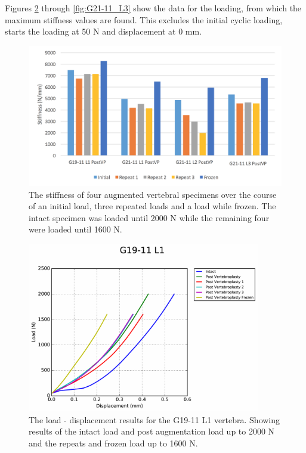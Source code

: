 Figures \ref{fig:G19-11_L1} through \ref{fig:G21-11_L3} show the data for the loading, from which the maximum stiffness values are found.
This excludes the initial cyclic loading, starts the loading at 50 N and displacement at 0 mm.

\begin{figure}[!h]
\centering
\includegraphics[width=6in]{Chapters/Chapter_HT_images/experimental_repeats.png}
\caption{The stiffness of four augmented vertebral specimens over the course of an initial load, three repeated loads and a load while frozen. The intact specimen was loaded until 2000 N while the remaining four were loaded until 1600 N.}
\label{fig:exp_repeats}
\end{figure}


\begin{figure}[ht]
\centering
\includegraphics[width=4in]{Chapters/Chapter_HT_images/G19-11_L1.pdf}
\caption{The load - displacement results for the G19-11 L1 vertebra. Showing results of the intact load and post augmentation load up to 2000 N and the repeats and frozen load up to 1600 N.}
\label{fig:G19-11_L1}
\end{figure}

